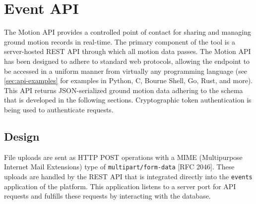\chapter{Event API}\label{ch:event-api}
\begingroup 


The \BRACE{} Motion API provides a controlled point of contact for sharing and managing ground motion records in real-time. The primary component of the tool is a server-hosted REST API through which all motion data passes. 
The Motion API has been designed to adhere to standard web protocols, allowing the endpoint to be accessed in a uniform manner from virtually any programming language (see \cref{sec:api-examples} for examples in Python, C, Bourne Shell, Go, Rust, and more). This API returns JSON-serialized ground motion data adhering to the schema that is developed in the following sections. Cryptographic token authentication is being used to authenticate requests.

\hypertarget{design}{%
\section{Design}\label{design}}

File uploads are sent as HTTP POST operations with a MIME (Multipurpose Internet Mail Extensions) type of
\texttt{multipart/form-data} {[}RFC 2046{]}.
These uploads are handled by the REST API that is integrated directly into the \texttt{events} application of the \gls{platform}.
This application listens to a server port for API requests and fulfills
these requests by interacting with the database.




\endgroup